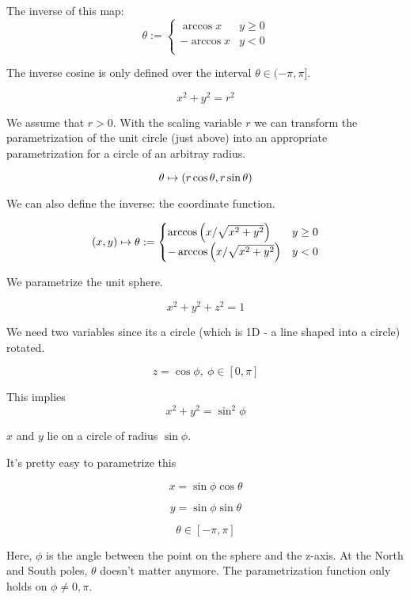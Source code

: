 \documentclass[11pt]{article}
\begin{document}
\begin{example}
  
  The inverse of this map:
  $$
  \theta :=
  \begin{cases}
    \arccos{x} & y \geq 0 \\
    - \arccos{x} & y < 0 \\
  \end{cases}
  $$

  The inverse cosine is only defined over the interval $\theta \in (-\pi, \pi]$.
\end{example}


\begin{example}

  $$x^2 + y^2 = r^2$$

  We assume that $r>0$.
  With the scaling variable $r$ we can transform the parametrization of the unit circle (just above) into an appropriate parametrization for a circle of an arbitray radius.

  
  $$
  \theta \mapsto \left ( r \cos \theta, r \sin \theta \right)
  $$

  We can also define the inverse: the coordinate function.

  $$
  \left ( x, y \right) \mapsto \theta := \begin{cases}
    \arccos \left ( x/\sqrt{x^2 + y^2} \right) & y \geq 0\\
    -\arccos \left ( x/\sqrt{x^2 + y^2} \right) & y < 0 \\
    \end{cases}
  $$
  
\end{example}

\begin{example}

  We parametrize the unit sphere.

  $$x^2 + y^2 + z^2 = 1$$

We need two variables since its a circle (which is 1D - a line shaped into a circle) rotated.

$$z = \cos \phi,\ \phi \in [0, \pi]$$

This implies $$x^2 +y^2 = \sin^2 \phi$$

$x$ and $y$ lie on a circle of radius $\sin \phi$.

It's pretty easy to parametrize this

$$x = \sin\phi \cos \theta$$

$$y = \sin\phi \sin \theta$$

$$\theta \in [-\pi, \pi]$$

Here, $\phi$ is the angle between the point on the sphere and the z-axis.
At the North and South poles, $\theta$ doesn't matter anymore.
The parametrization function only holds on $\phi \neq 0,  \pi$.
\end{example}
\end{document}
